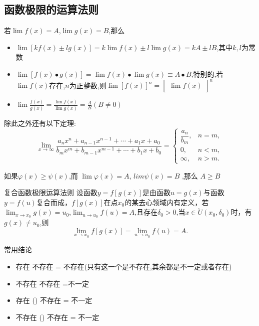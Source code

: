 \documentclass[12pt, a4paper, oneside, UTF8]{ctexbook}  %
\begin{document}
\begin{sloppypar}
    \subsection{函数极限的运算法则}
    若$\lim f(x)=A$,$\lim g(x)=B$,那么
    \begin{itemize}
        \item $\operatorname*{lim}[kf(x)\pm lg(x)]=k\operatorname*{lim}f(x)\pm l\operatorname*{lim}g(x)=kA\pm lB$,其中$k,l$为常数
        \item $\operatorname*{lim}[f(x)\bullet g(x)]=\operatorname*{lim}f(x)\bullet\operatorname*{lim}g(x)\equiv A\bullet B$,特别的,若$\lim f(x)$存在,$n$为正整数,则$\operatorname{lim}[f(x)]^n=\begin{bmatrix}\operatorname{lim}f(x)\end{bmatrix}^n$
        \item $\operatorname*{lim}\frac{f(x)}{g(x)}=\frac{\operatorname*{lim}f(x)}{\operatorname*{lim}g(x)}=\frac{A}{B}(B\neq0)$
    \end{itemize}
    除此之外还有以下定理:
    $$
        \lim_{x\to\infty}\frac{a_nx^n+a_{n-1}x^{n-1}+\cdots+a_{1}x+a_0}{b_mx^m+b_{m-1}x^{m-1}+\cdots+b_1x+b_0}=\begin{cases}\dfrac{a_n}{b_m},&n=m,\\[2ex]0,&n<m,\\[2ex]\infty,&n>m.\end{cases}
    $$
    \begin{them}{}{}
        如果$\varphi(x)\geqslant\psi(x)$,而 $\lim\varphi(x)=A$, $lim \psi(x)=B$ ,那么 $A\geqslant B$
    \end{them}
    \begin{them}{复合函数极限运算法则}{}
        设函数$y=f[g(x)]$是由函数$u=g(x)$与函数$y=f(u)$复合而成，$f[g(x)]$在点$x_0$的某去心领域内有定义，若$\lim_{x \to  x_0} g(x)=u_0$,$\lim_{u \to u_0}f(u)=A$,且存在$\delta_0 >0$,当$x\in\mathring{U}\left(x_{0},\delta_{0}\right)$时，有$g\left(x\right)\neq u_{0}$,则
        $$
            \underset{x\to x_0}{\operatorname*{lim}}f[g(x)]=\underset{u\to u_0}{\operatorname*{lim}}f(u)=A.
        $$
    \end{them}
    \begin{criterion}{常用结论}{}
        \begin{itemize}
            \item 存在 \pm 不存在 = 不存在(只有这一个是不存在,其余都是不一定或者存在)
            \item 不存在 \pm 不存在 =不一定
            \item 存在 \times (\div) 不存在 = 不一定
            \item 不存在 \times (\div) 不存在 = 不一定
        \end{itemize}
    \end{criterion}


\end{sloppypar}
\end{document}
